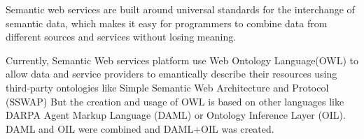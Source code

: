 Semantic web services are built around universal standards for the interchange of semantic data, which makes it easy for programmers to combine data from different sources and services without losing meaning.

Currently, Semantic Web services platform use Web Ontology Language(OWL) to allow data and service providers to emantically describe their resources using third-party ontologies like Simple Semantic Web Architecture and Protocol (SSWAP) But the creation and usage of OWL is based on other languages like DARPA Agent Markup Language (DAML) or Ontology Inference Layer (OIL). DAML and OIL were combined and DAML+OIL was created.


